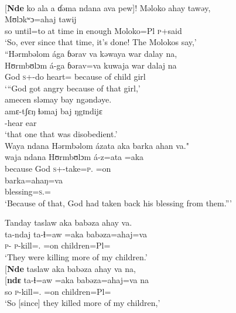 \ea \label{ex:12:58}
\\
{}[\textbf{Nde} ko  ala  a  ɗəma  ndana    ava  pew]!  Məloko  ahay  tawəy,\\  
\gll  [\textbf{ndɛ} kʷɔ=ala  a ɗəma ndana ava pɛw] Mʊlɔkʷɔ=ahaj tawij \\
      so until=to at  time {\DEM} in enough  Moloko=Pl \textsc{p}+said\\ 
\glt ‘So, ever since that time, it’s done!  The Molokos say,’\\      
      
\medskip  
“Hərmbəlom  ága  ɓərav  va  kəwaya  war  dalay  na,\\    
\gll Hʊrmbʊlɔm á-ga ɓərav=va kuwaja war dalaj na\\
     God \textsc{s}+{\IFV}-do heart={\PRF} {because of}  child girl {\PSP}\\ 
\glt ‘“God got angry because of that girl,’\\

\medskip
\largerpage
amecen  sləmay  bay  ngəndəye.\\
\gll amɛ-tʃɛŋ ɬəmaj baj ŋgɪndijɛ \\ 
     {\DEP}-hear ear {\NEG} {\DEM}\\ 
\glt ‘that one that was disobedient.’\\

\medskip
Waya  ndana  Hərmbəlom  ázata  aka  barka  ahan  va."\\
\gll waja ndana Hʊrmbʊlɔm á-z=ata  =aka \\ 
     because {\DEM} God \textsc{s}+{\IFV}-take=\textsc{p}.{\IO}  =on \\  

\medskip
\gll barka=ahaŋ=va\\
     blessing=\textsc{s}.{\POSS}={\PRF}\\
\glt  ‘Because of that, God had taken back his blessing from them.”’
\z 

\ea \label{ex:12:59}
Tanday  taslaw  aka  babəza  ahay  va.\\   
\gll  ta-ndaj ta-ɬ=aw =aka babəza=ahaj=va \\  
      \textsc{p}-{\PROG}  \textsc{p}-kill={\oneS}.{\IO}  =on  children=Pl={\PRF}\\   
\glt ‘They were killing more of my children.’\\

\medskip
{}[\textbf{Nde} taslaw  aka  babəza  ahay  va  na,\\ 
\gll {}[\textbf{ndɛ}  ta-ɬ=aw =aka babəza=ahaj=va na\\
     so    \textsc{p}-kill={\oneS}.{\IO}  =on  children=Pl={\PRF}  {\PSP}\\
\glt ‘So [since] they killed more of my children,’\\

